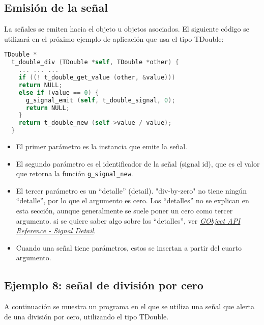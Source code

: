 \subsection{Emisión de la señal}
La señales se emiten hacia el objeto u objetos asociados. El siguiente código se utilizará en
el próximo ejemplo de aplicación que usa el tipo \textsf{TDouble}:
\begin{lstlisting}[language=C, numbers=none]
  TDouble *
  t_double_div (TDouble *self, TDouble *other) {
    ... ... ...
    if ((! t_double_get_value (other, &value)))
    return NULL;
    else if (value == 0) {
      g_signal_emit (self, t_double_signal, 0);
      return NULL;
    }
    return t_double_new (self->value / value);
  }
\end{lstlisting}

\begin{itemize}
  \tightlist
\item El primer parámetro es la instancia que emite la señal.
\item El segundo parámetro es el identificador de la señal (\textsf{signal id}), que es
  el valor que retorna la función \texttt{g\_signal\_new}.
\item El tercer parámetro es un ``detalle'' (\textsf{detail}). \textsf{"div-by-zero"} no
  tiene ningún ``detalle'', por lo que el argumento es cero. Los ``detalles'' no se
  explican en esta sección, aunque generalmente se suele poner un cero como tercer
  argumento. si se quiere saber algo sobre los ``detalles'', ver
  \href{https://docs.gtk.org/gobject/concepts.html#the-detail-argument}
  {\emph{\textsf{GObject API Reference - Signal Detail}}}.
\item Cuando una señal tiene parámetros, estos se insertan a partir del cuarto argumento.
\end{itemize}

\subsection{Ejemplo 8: señal de división por cero}
A continuación se muestra un programa en el que se utiliza una señal que alerta de una división por cero, utilizando el tipo \textsf{TDouble}.

